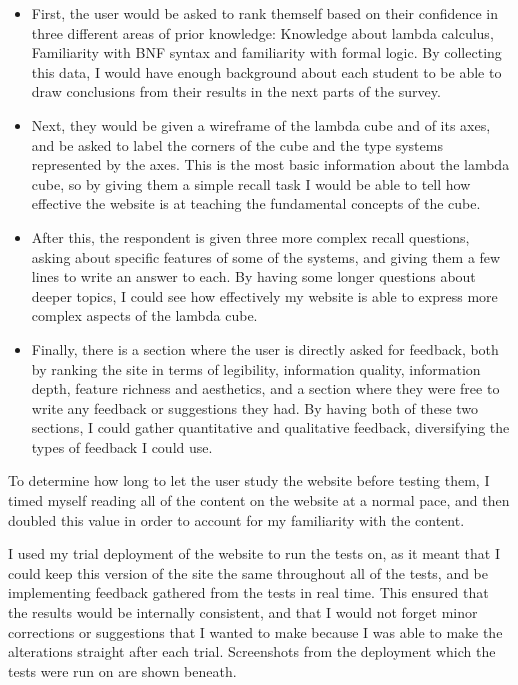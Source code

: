 \documentclass{l4proj}
\begin{document}
\begin{itemize}
    \item First, the user would be asked to rank themself based on their confidence in three different areas of prior knowledge: Knowledge about lambda calculus, Familiarity with BNF syntax and familiarity with formal logic.  By collecting this data, I would have enough background about each student to be able to draw conclusions from their results in the next parts of the survey.

    \item Next, they would be given a wireframe of the lambda cube and of its axes, and be asked to label the corners of the cube and the type systems represented by the axes.  This is the most basic information about the lambda cube, so by giving them a simple recall task I would be able to tell how effective the website is at teaching the fundamental concepts of the cube.

    \item After this, the respondent is given three more complex recall questions, asking about specific features of some of the systems, and giving them a few lines to write an answer to each.  By having some longer questions about deeper topics, I could see how effectively my website is able to express more complex aspects of the lambda cube.

    \item Finally, there is a section where the user is directly asked for feedback, both by ranking the site in terms of legibility, information quality, information depth, feature richness and aesthetics, and a section where they were free to write any feedback or suggestions they had.  By having both of these two sections, I could gather quantitative and qualitative feedback, diversifying the types of feedback I could use.
\end{itemize}

To determine how long to let the user study the website before testing them, I timed myself reading all of the content on the website at a normal pace, and then doubled this value in order to account for my familiarity with the content.

I used my trial deployment of the website to run the tests on, as it meant that I could keep this version of the site the same throughout all of the tests, and be implementing feedback gathered from the tests in real time.  This ensured that the results would be internally consistent, and that I would not forget minor corrections or suggestions that I wanted to make because I was able to make the alterations straight after each trial.  Screenshots from the deployment which the tests were run on are shown beneath.
\end{document}
